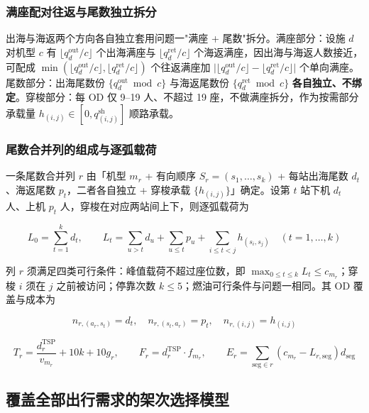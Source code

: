 \documentclass[zihao=-4,a4paper]{ctexart}
\begin{document}
\subsubsection{满座配对往返与尾数独立拆分}

出海与海返两个方向各自独立套用问题一"满座 + 尾数"拆分。满座部分：设施 $d$ 对机型 $c$ 有 $\lfloor q_d^{\text{out}}/c\rfloor$ 个出海满座与 $\lfloor q_d^{\text{ret}}/c\rfloor$ 个海返满座，因出海与海返人数接近，可配成 $\min(\lfloor q_d^{\text{out}}/c\rfloor,\lfloor q_d^{\text{ret}}/c\rfloor)$ 个往返满座加 $\big|\lfloor q_d^{\text{out}}/c\rfloor-\lfloor q_d^{\text{ret}}/c\rfloor\big|$ 个单向满座。尾数部分：出海尾数份 $\{q_d^{\text{out}}\bmod c\}$ 与海返尾数份 $\{q_d^{\text{ret}}\bmod c\}$ \textbf{各自独立、不绑定}。穿梭部分：每 OD 仅 9--19 人、不超过 19 座，不做满座拆分，作为按需部分承载量 $h_{(i,j)}\in[0,q^{\text{sh}}_{(i,j)}]$ 顺路承载。

\subsubsection{尾数合并列的组成与逐弧载荷}

一条尾数合并列 $r$ 由「机型 $m_r$ + 有向顺序 $S_r=(s_1,\dots,s_k)$ + 每站出海尾数 $d_t$、海返尾数 $p_t$，二者各自独立 + 穿梭承载 $\{h_{(i,j)}\}$」确定。设第 $t$ 站下机 $d_t$ 人、上机 $p_t$ 人，穿梭在对应两站间上下，则逐弧载荷为

\begin{equation}
  L_0=\sum_{t=1}^{k}d_t,\qquad
  L_t=\sum_{u>t} d_u+\sum_{u\le t} p_u+\sum_{i\le t<j} h_{(s_i,s_j)}\quad(t=1,\dots,k)
\end{equation}

列 $r$ 须满足四类可行条件：峰值载荷不超过座位数，即 $\max_{0\le t\le k}L_t\le c_{m_r}$；穿梭 $i$ 须在 $j$ 之前被访问；停靠次数 $k\le5$；燃油可行条件与问题一相同。其 OD 覆盖与成本为

\begin{equation}
  n_{r,(a_r,s_t)}=d_t,\quad n_{r,(s_t,a_r)}=p_t,\quad n_{r,(i,j)}=h_{(i,j)}
\end{equation}

\begin{equation}
  T_r=\frac{d_r^{\text{TSP}}}{v_{m_r}}+10k+10g_r,\qquad
  F_r=d_r^{\text{TSP}}\cdot f_{m_r},\qquad
  E_r=\sum_{\text{seg}\in r}(c_{m_r}-L_{r,\text{seg}})d_{\text{seg}}
\end{equation}

\subsection{覆盖全部出行需求的架次选择模型}
\end{document}
